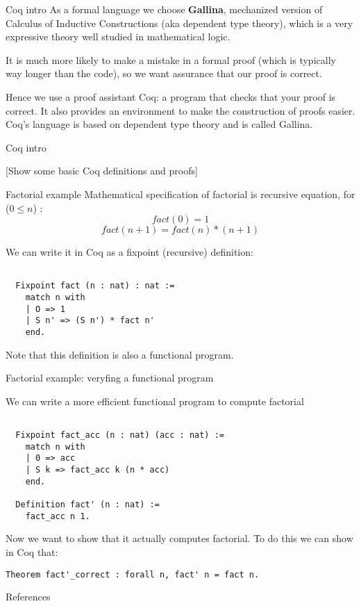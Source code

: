 \documentclass[10pt]{beamer}
\begin{document}
\begin{frame}{Coq intro}
  As a formal language we choose {\bf Gallina}, mechanized version of Calculus of Inductive Constructions (aka dependent type theory), which is a very expressive theory well studied in mathematical logic.


  \smallskip
  
  It is much more likely to make a mistake in a formal proof (which is typically way longer than the code), so we want assurance that our proof is correct.
  \smallskip
  
  Hence we use a proof assistant Coq: a program that checks that your proof is correct. It also provides an environment to make the construction of proofs easier. Coq's language is based on dependent type theory and is called Gallina.
  
\end{frame}
\begin{frame}{Coq intro}
  
 [Show some basic Coq definitions and proofs]
  
\end{frame}

\begin{frame}[fragile]{Factorial example}
  Mathematical specification of factorial is recursive equation, for ($0 \leq n$) :
  \[ fact(0) = 1 \]
  \[ fact(n + 1) = fact(n)*(n+1) \]
  
  We can write it in Coq as a fixpoint (recursive) definition:
  \begin{lstlisting}[language=Coq]

  Fixpoint fact (n : nat) : nat :=
    match n with
    | O => 1
    | S n' => (S n') * fact n'
    end.

  \end{lstlisting}
  
  Note that this definition is also a functional program.
 
\end{frame}

\begin{frame}[fragile]{Factorial example: veryfing a functional program}

  We can write a more efficient functional program to compute factorial

  \begin{lstlisting}[language=Coq]

  Fixpoint fact_acc (n : nat) (acc : nat) :=
    match n with
    | 0 => acc
    | S k => fact_acc k (n * acc)
    end.

  Definition fact' (n : nat) :=
    fact_acc n 1.

  \end{lstlisting}

  Now we want to show that it actually computes factorial. To do this we can show in Coq that:
   \begin{lstlisting}[language=Coq]
  Theorem fact'_correct : forall n, fact' n = fact n.
  \end{lstlisting}
 
\end{frame}


\begin{frame}[allowframebreaks]{References}

  
  

\end{frame}
\end{document}
